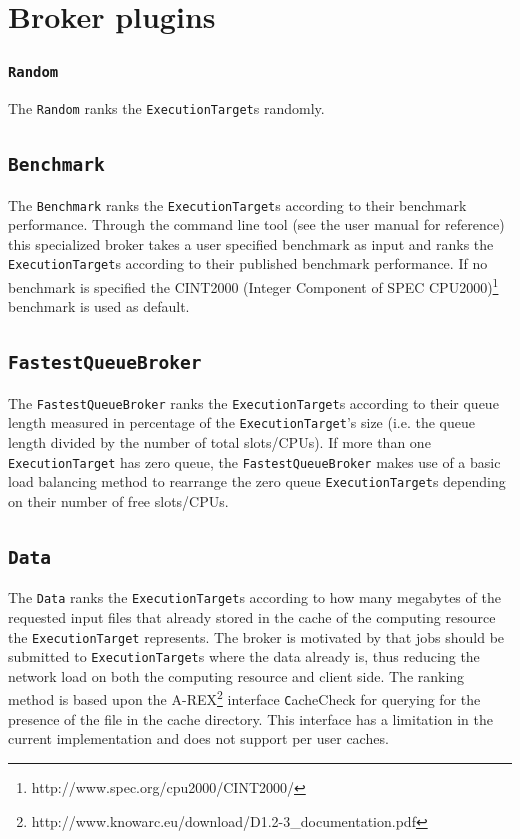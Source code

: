 \documentclass{book}
\newcommand{\Random}{\texttt{Random}}
\newcommand{\Benchmark}{\texttt{Benchmark}}
\newcommand{\FastestQueueBroker}{\texttt{FastestQueueBroker}}
\newcommand{\Data}{\texttt{Data}}
\newcommand{\ExecutionTarget}{\texttt{ExecutionTarget}}
\begin{document}
\section{Broker plugins}
\label{sec:brokerplugins}

\subsubsection{\Random}

The {\Random} ranks the {\ExecutionTarget}s randomly. 

\subsection{\Benchmark}

The {\Benchmark} ranks the {\ExecutionTarget}s according to their
benchmark performance. Through the command line tool (see the user
manual\cite{ui} for reference) this specialized broker takes a user
specified benchmark as input and ranks the {\ExecutionTarget}s
according to their published benchmark performance. If no benchmark is
specified the CINT2000 (Integer Component of SPEC
CPU2000)\footnote{http://www.spec.org/cpu2000/CINT2000/} benchmark is
used as default.

\subsection{\FastestQueueBroker}

The {\FastestQueueBroker} ranks the {\ExecutionTarget}s according to
their queue length measured in percentage of the {\ExecutionTarget}'s
size (i.e. the queue length divided by the number of total
slots/CPUs). If more than one {\ExecutionTarget} has zero queue, the
{\FastestQueueBroker} makes use of a basic load balancing method to
rearrange the zero queue {\ExecutionTarget}s depending on their number
of free slots/CPUs.

\subsection{\Data}

The {\Data} ranks the {\ExecutionTarget}s according to how many
megabytes of the requested input files that already stored in the
cache of the computing resource the {\ExecutionTarget} represents. The
broker is motivated by that jobs should be submitted to
{\ExecutionTarget}s where the data already is, thus reducing the
network load on both the computing resource and client side. The
ranking method is based upon the
A-REX\footnote{http://www.knowarc.eu/download/D1.2-3\_documentation.pdf}
interface {\texttt CacheCheck} for querying for the presence of the
file in the cache directory. This interface has a limitation in the
current implementation and does not support per user caches.
\end{document}
